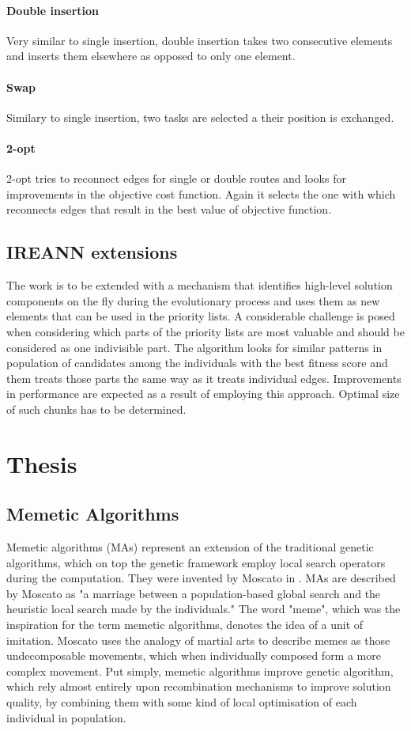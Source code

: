 \documentclass[twoside]{ctuthesis}
\theoremstyle{plain}
\theoremstyle{definition}
\theoremstyle{note}
\begin{document}
\subsubsection{Double insertion}
Very similar to single insertion, double insertion takes two consecutive elements and inserts them elsewhere as opposed to only one element.
\subsubsection{Swap}
Similary to single insertion, two tasks are selected a their position is exchanged.
\subsubsection{2-opt}
2-opt tries to reconnect edges for single or double routes and looks for improvements in the objective cost function. Again it selects the one with which reconnects edges that result in the best value of objective function.

\section{IREANN extensions}
The work is to be extended with a mechanism that identifies high-level solution components on the fly during the evolutionary process and uses them as new elements that can be used in the priority lists. A considerable challenge is posed when considering which parts of the priority lists are most valuable and should be considered as one indivisible part. The algorithm looks for similar patterns in population of candidates among the individuals with the best fitness score and them treats those parts the same way as it treats individual edges. Improvements in performance are expected as a result of employing this approach. Optimal size of such chunks has to be determined.	

\chapter{Thesis}
\section{Memetic Algorithms}
Memetic algorithms (MAs) represent an extension of the traditional genetic algorithms, which on top the genetic framework employ local search operators during the computation. They were invented by Moscato in \cite{moscato1989evolution}. MAs are described by Moscato as "a marriage between a population-based global search and the heuristic local search made by the individuals." The word "meme", which was the inspiration for the term memetic algorithms, denotes the idea of a unit of imitation. Moscato uses the analogy of martial arts to describe memes as those undecomposable movements, which when individually composed form a more complex movement. Put simply, memetic algorithms improve genetic algorithm, which rely almost entirely upon recombination mechanisms to improve solution quality, by combining them with some kind of local optimisation of each individual in population. 
\end{document}
